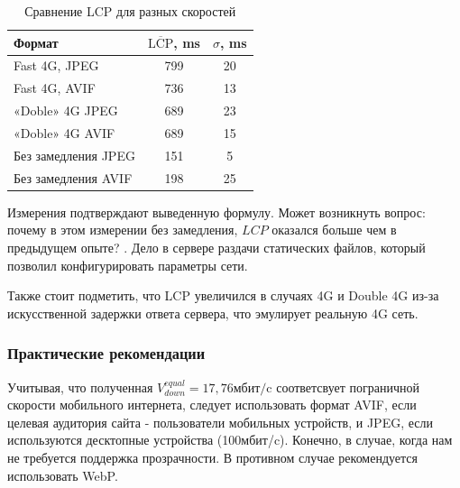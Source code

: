 \documentclass[12pt]{article}
\begin{document}
\begin{table}[H]
    \centering
    \caption{Сравнение LCP для разных скоростей}
    \begin{tabular}{l S[table-format=3.2] S[table-format=2.2]}
        \toprule
        Формат              & {$\overline{\text{LCP}}$, \si{\milli\second}} & {$\sigma$, \si{\milli\second}} \\
        \midrule
        Fast 4G, JPEG       & 799                                           & 20                             \\
        Fast 4G, AVIF       & 736                                           & 13                             \\
        «Doble» 4G JPEG     & 689                                           & 23                             \\
        «Doble» 4G AVIF     & 689                                           & 15                             \\
        Без замедления JPEG & 151                                           & 5                              \\
        Без замедления AVIF & 198                                           & 25                             \\
        \bottomrule
    \end{tabular}
\end{table}

Измерения подтверждают выведенную формулу. Может возникнуть вопрос: почему в этом измерении без замедления, $LCP$ оказался больше чем в предыдущем опыте? .
Дело в сервере раздачи статических файлов, который позволил конфигурировать параметры сети.

Также стоит подметить, что LCP увеличился в случаях 4G и Double 4G из-за искусственной задержки ответа сервера,
что эмулирует реальную 4G сеть.

\subsubsection{Практические рекомендации }

Учитывая, что полученная $V^{equal}_{down} = 17,76 \text{мбит/c}$
соответсвует пограничной скорости мобильного интернета,
следует использовать формат AVIF, если целевая аудитория сайта - пользователи
мобильных устройств, и JPEG, если используются десктопные устройства (100мбит/c).
Конечно, в случае, когда нам не требуется поддержка прозрачности.
В противном случае рекомендуется использовать WebP.
\end{document}

